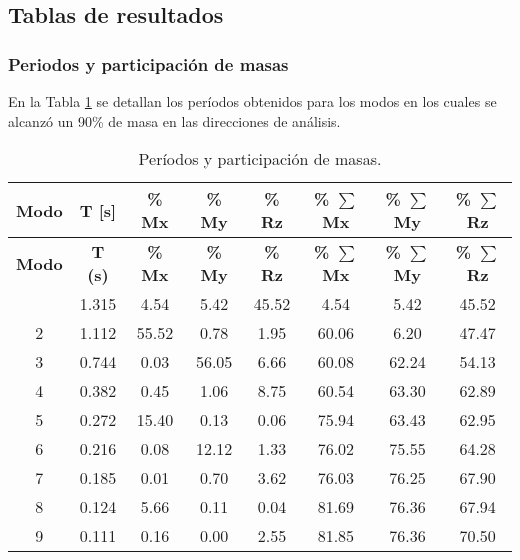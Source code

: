 \newpage
\subsection{Tablas de resultados}

\subsubsection{Periodos y participación de masas}

En la Tabla \ref{tabla-periodo-participacion} se detallan los períodos obtenidos para los modos en los cuales se alcanzó un 90\% de masa en las direcciones de análisis.

\begin{longtable}{cccccccc}
\caption{Períodos y participación de masas.}\label{tabla-periodo-participacion}\\
\hline
\multicolumn{1}{|c}{\textbf{Modo}} & \textbf{T [s]} & \textbf{\% Mx} & \textbf{\% My} & \textbf{\% Rz} & \textbf{\% \boldmath{}\textbf{$\sum$}\unboldmath{}Mx} & \textbf{\% \boldmath{}\textbf{$\sum$}\unboldmath{}My} & \textbf{\% \boldmath{}\textbf{$\sum$}\unboldmath{}Rz} \bigstrut\\
\hline
\endfirsthead
\hline
\multicolumn{1}{|c}{\textbf{Modo}} & \textbf{T (s)} & \textbf{\% Mx} & \textbf{\% My} & \textbf{\% Rz} & \textbf{\% \boldmath{}\textbf{$\sum$}\unboldmath{}Mx} & \textbf{\% \boldmath{}\textbf{$\sum$}\unboldmath{}My} & \textbf{\% \boldmath{}\textbf{$\sum$}\unboldmath{}Rz} \bigstrut\\
\hline
\endhead
\hline
\endfoot
\hline
\endlastfoot
1     & 1.315 & 4.54  & 5.42  & 45.52 & 4.54  & 5.42  & 45.52 \\
    2     & 1.112 & 55.52 & 0.78  & 1.95  & 60.06 & 6.20  & 47.47 \\
    3     & 0.744 & 0.03  & 56.05 & 6.66  & 60.08 & 62.24 & 54.13 \\
    4     & 0.382 & 0.45  & 1.06  & 8.75  & 60.54 & 63.30 & 62.89 \\
    5     & 0.272 & 15.40 & 0.13  & 0.06  & 75.94 & 63.43 & 62.95 \\
    6     & 0.216 & 0.08  & 12.12 & 1.33  & 76.02 & 75.55 & 64.28 \\
    7     & 0.185 & 0.01  & 0.70  & 3.62  & 76.03 & 76.25 & 67.90 \\
    8     & 0.124 & 5.66  & 0.11  & 0.04  & 81.69 & 76.36 & 67.94 \\
    9     & 0.111 & 0.16  & 0.00  & 2.55  & 81.85 & 76.36 & 70.50 \\

\end{longtable}
